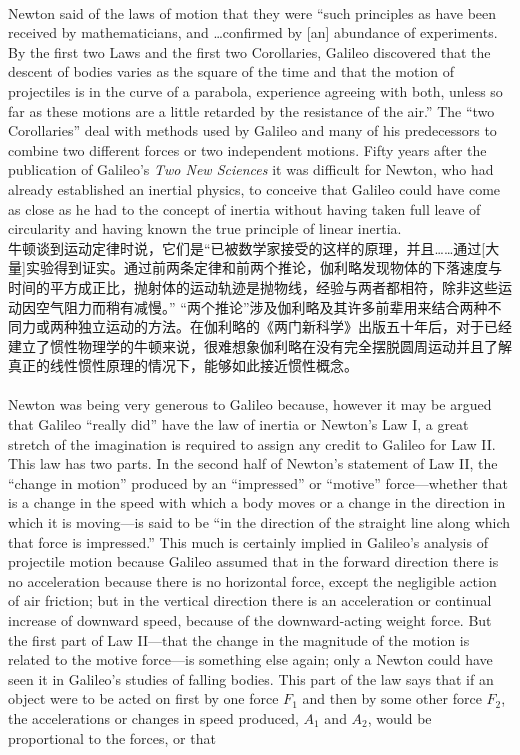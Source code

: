 \documentclass{article}
\begin{document}
\\
Newton said of the laws of motion that they were ``such principles as have been received by mathematicians, and \ldots confirmed by [an] abundance of experiments. By the first two Laws and the first two Corollaries, Galileo discovered that the descent of bodies varies as the square of the time and that the motion of projectiles is in the curve of a parabola, experience agreeing with both, unless so far as these motions are a little retarded by the resistance of the air.'' The ``two Corollaries'' deal with methods used by Galileo and many of his predecessors to combine two different forces or two independent motions. Fifty years after the publication of Galileo's \textit{Two New Sciences} it was difficult for Newton, who had already established an inertial physics, to conceive that Galileo could have come as close as he had to the concept of inertia without having taken full leave of circularity and having known the true principle of linear inertia.\\
牛顿谈到运动定律时说，它们是“已被数学家接受的这样的原理，并且……通过[大量]实验得到证实。通过前两条定律和前两个推论，伽利略发现物体的下落速度与时间的平方成正比，抛射体的运动轨迹是抛物线，经验与两者都相符，除非这些运动因空气阻力而稍有减慢。” “两个推论”涉及伽利略及其许多前辈用来结合两种不同力或两种独立运动的方法。在伽利略的《两门新科学》出版五十年后，对于已经建立了惯性物理学的牛顿来说，很难想象伽利略在没有完全摆脱圆周运动并且了解真正的线性惯性原理的情况下，能够如此接近惯性概念。\\

\\
Newton was being very generous to Galileo because, however it may be argued that Galileo ``really did'' have the law of inertia or Newton's Law I, a great stretch of the imagination is required to assign any credit to Galileo for Law II. This law has two parts. In the second half of Newton's statement of Law II, the ``change in motion'' produced by an ``impressed'' or ``motive'' force—whether that is a change in the speed with which a body moves or a change in the direction in which it is moving—is said to be ``in the direction of the straight line along which that force is impressed.'' This much is certainly implied in Galileo's analysis of projectile motion because Galileo assumed that in the forward direction there is no acceleration because there is no horizontal force, except the negligible action of air friction; but in the vertical direction there is an acceleration or continual increase of downward speed, because of the downward-acting weight force. But the first part of Law II—that the change in the magnitude of the motion is related to the motive force—is something else again; only a Newton could have seen it in Galileo's studies of falling bodies. This part of the law says that if an object were to be acted on first by one force \( F_1 \) and then by some other force \( F_2 \), the accelerations or changes in speed produced, \( A_1 \) and \( A_2 \), would be proportional to the forces, or that
\end{document}
